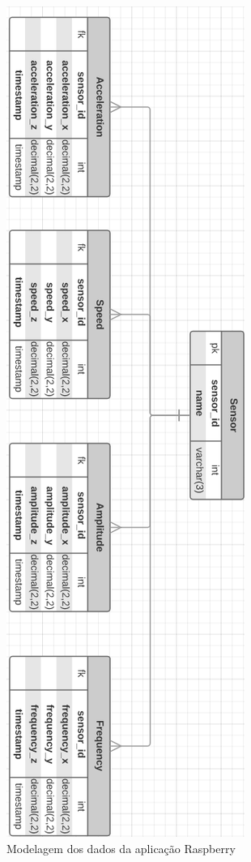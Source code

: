 \begin{figure}[H]
\centering
\includegraphics[keepaspectratio=true,scale=0.8]{figuras/banco-rasp.png}
\caption{Modelagem dos dados da aplicação Raspberry}
\label{fig:banco_rasp}
\end{figure}


